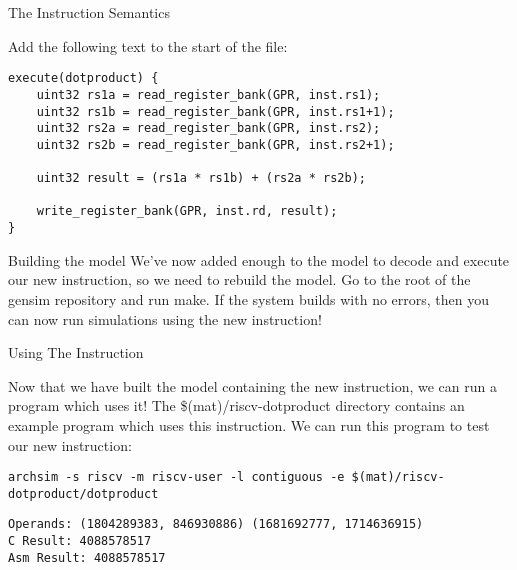 \begin{frame}[fragile]{The Instruction Semantics}

Add the following text to the start of the file:

\begin{lstlisting}
execute(dotproduct) {
	uint32 rs1a = read_register_bank(GPR, inst.rs1);
	uint32 rs1b = read_register_bank(GPR, inst.rs1+1);
	uint32 rs2a = read_register_bank(GPR, inst.rs2);
	uint32 rs2b = read_register_bank(GPR, inst.rs2+1);
	
	uint32 result = (rs1a * rs1b) + (rs2a * rs2b);
	
	write_register_bank(GPR, inst.rd, result);
}
\end{lstlisting}

\end{frame}

\begin{frame}{Building the model}
We've now added enough to the model to decode and execute our new 
instruction, so we need to rebuild the model. Go to the root of the
gensim repository and run {\ttfamily make}. If the system builds with no errors,
then you can now run simulations using the new instruction!
\end{frame}

\begin{frame}[fragile]{Using The Instruction}

Now that we have built the model containing the new instruction, we can
run a program which uses it! The {\ttfamily \$(mat)/riscv-dotproduct} directory contains
an example program which uses this instruction. We can run this program to
test our new instruction:

\begin{lstlisting}[basicstyle=\ttfamily\ssmall]
archsim -s riscv -m riscv-user -l contiguous -e $(mat)/riscv-dotproduct/dotproduct
\end{lstlisting}

\bigskip

\begin{lstlisting}
Operands: (1804289383, 846930886) (1681692777, 1714636915)
C Result: 4088578517
Asm Result: 4088578517
\end{lstlisting}

\end{frame}
